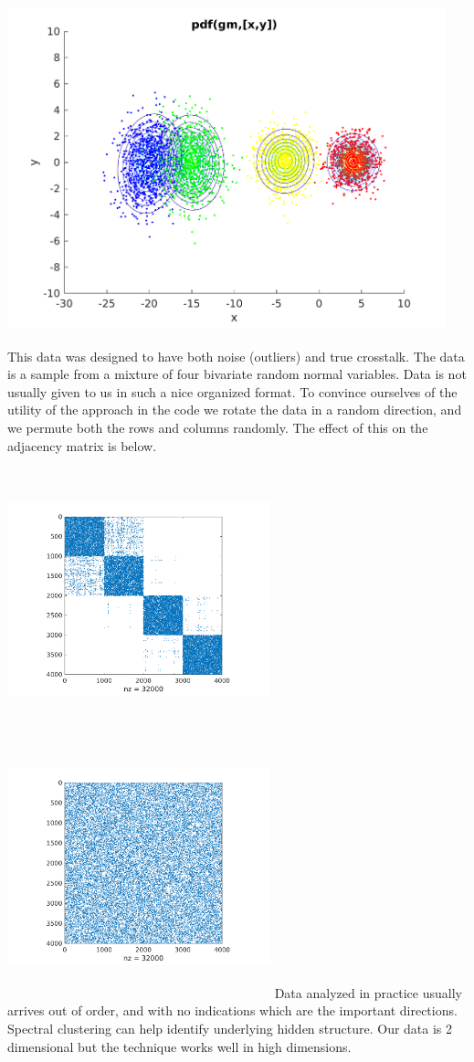 \includegraphics[width=5in,height=4in]{images/4class.png}
This data was designed to have both noise (outliers) and true crosstalk. The data is a sample from a mixture of four bivariate random normal variables.  Data is not usually given to us in such a nice organized format. To convince ourselves of the utility of the approach in the code we rotate the data in a random direction, and we permute both the rows and columns randomly. The effect of this on the adjacency matrix is below. 

\includegraphics[width=3in,height=3in]{images/spy.png}
\includegraphics[width=3in,height=3in]{images/spy_randomized.png}
Data analyzed in practice usually arrives out of order, and with no indications which are the important directions. Spectral clustering can help identify underlying hidden structure.  Our data is 2 dimensional but the technique works well in high dimensions.  

